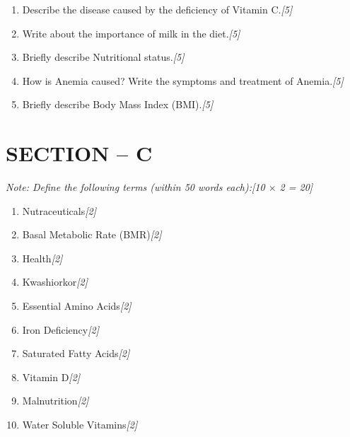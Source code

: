 \documentclass[11pt,a4paper]{article}
\newcommand{\pts}[1]{\hfill \textit{[#1]}}
\begin{document}
\begin{enumerate}[label=\textbf{\arabic*.},leftmargin=*,start=5,itemsep=8pt]

  \item Describe the disease caused by the deficiency of Vitamin C.\pts{5}

  \item Write about the importance of milk in the diet.\pts{5}

  \item Briefly describe Nutritional status.\pts{5}

  \item How is Anemia caused? Write the symptoms and treatment of Anemia.\pts{5}

  \item Briefly describe Body Mass Index (BMI).\pts{5}

\end{enumerate}

\bigskip

\section*{SECTION -- C}
\noindent \textit{Note: Define the following terms (within 50 words each):}\pts{10 $\times$ 2 = 20}

\begin{enumerate}[label=(\alph*),leftmargin=*,itemsep=6pt]

  \item Nutraceuticals\pts{2}
  \item Basal Metabolic Rate (BMR)\pts{2}
  \item Health\pts{2}
  \item Kwashiorkor\pts{2}
  \item Essential Amino Acids\pts{2}
  \item Iron Deficiency\pts{2}
  \item Saturated Fatty Acids\pts{2}
  \item Vitamin D\pts{2}
  \item Malnutrition\pts{2}
  \item Water Soluble Vitamins\pts{2}

\end{enumerate}
\end{document}
